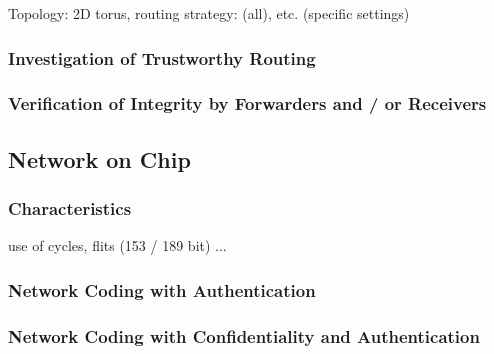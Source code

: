 \documentclass[12pt]{article}
\begin{document}
Topology: 2D torus, routing strategy: (all), etc. (specific settings)

\subsubsection{Investigation of Trustworthy Routing } 

\subsubsection{Verification of Integrity by Forwarders and / or Receivers}



\subsection{Network on Chip}

\subsubsection{Characteristics}

use of cycles, flits (153 / 189 bit) ...

\subsubsection{Network Coding with Authentication}

\subsubsection{Network Coding with Confidentiality and Authentication}

 
\end{document}
